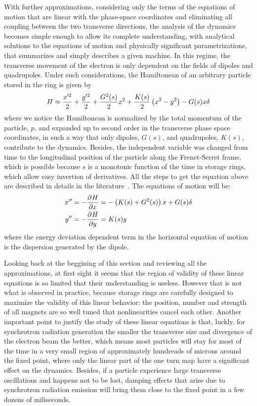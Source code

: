 	With further approximations, considering only the terms of the equations of motion that are linear with the phase-space coordinates and eliminating all coupling between the two transverse directions, the analysis of the dynamics becomes simple enough to allow its complete understanding, with analytical solutions to the equations of motion and physically significant parametrizations, that summarizes and simply describes a given machine. In this regime, the transverse movement of the electron is only dependent on the fields of dipoles and quadrupoles. Under such considerations, the Hamiltonean of an arbitrary particle stored in the ring is given by
    \begin{align}\label{eq:approximated_hamiltonean}
        H \approx \frac{x'^2}{2} + \frac{y'^2}{2} + \frac{G^2(s)}{2}x^2 + \frac{K(s)}{2}\left(x^2-y^2\right) - G(s)x\delta
    \end{align}
    where we notice the Hamiltonean is normalized by the total momentum of the particle, $p$, and expanded up to second order in the transverse phase space coordinates, in such a way that only dipoles, $G(s)$, and quadrupoles, $K(s)$, contribute to the dynamics. Besides, the independent variable was changed from time to the longitudinal position of the particle along the Frenet-Serret frame, which is possible because $s$ is a monotonic function of the time in storage rings, which allow easy invertion of derivatives. All the steps to get the equation above are described in details in the literature~\cite{Bengtsson1997,Lee1999,Wiedemann2007}. The equations of motion will be:
    \begin{align}\label{eq:linear_equation_motion}
        x'' &= -\frac{\partial^{{}}H}{\partial x^{{}}} = -\left(K(s)+G^2(s)\right)x + G(s)\delta\\\nonumber
        y'' &= -\frac{\partial^{{}}H}{\partial y^{{}}} = K(s)y
    \end{align}
    where the energy deviation dependent term in the horizontal equation of motion is the dispersion generated by the dipole.

	Looking back at the beggining of this section and reviewing all the approximations, at first sight it seems that the region of validity of these linear equations is so limited that their understanding is useless. However that is not what is observed in practice, because storage rings are carefully designed to maximize the validity of this linear behavior: the position, number and strength of all magnets are so well tuned that nonlinearities cancel each other. Another important point to justify the study of these linear equations is that, luckly, for synchrotron radiation generation the smaller the transverse size and divergence of the electron beam the better, which means most particles will stay for most of the time in a very small region of approximately hundreads of microns around the fixed point, where only the linear part of the one turn map have a significant effect on the dynamics. Besides, if a particle experience large transverse oscillations and happens not to be lost, damping effects that arise due to synchrotron radiation emission will bring them close to the fixed point in a few dozens of miliseconds.

